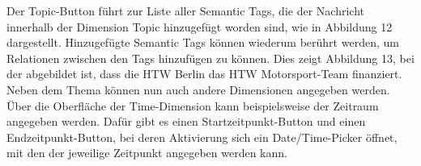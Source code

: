 \newline\newline\newline Der Topic-Button führt zur Liste aller Semantic Tags, die der Nachricht innerhalb der Dimension Topic hinzugefügt worden sind, wie in Abbildung 12 dargestellt. Hinzugefügte Semantic Tags können wiederum berührt werden, um Relationen zwischen den Tags hinzufügen zu können. Dies zeigt Abbildung 13, bei der abgebildet ist, dass die HTW Berlin das HTW Motorsport-Team finanziert. 
\newpage
Neben dem Thema können nun auch andere Dimensionen angegeben werden. Über die Oberfläche der Time-Dimension kann beispielsweise der Zeitraum angegeben werden. Dafür gibt es einen Startzeitpunkt-Button und einen Endzeitpunkt-Button, bei deren Aktivierung sich ein Date/Time-Picker öffnet, mit den der jeweilige Zeitpunkt angegeben werden kann.\newline\newline
\hspace*{0cm}
